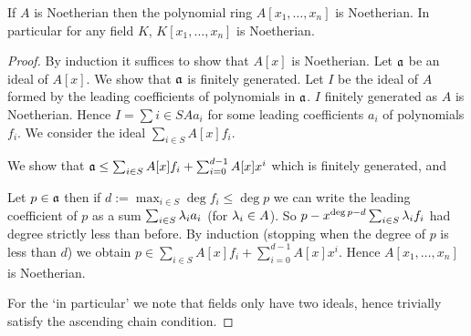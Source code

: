 \begin{prop}
    If $A$ is Noetherian then the polynomial ring $A[x_1, \dots, x_n]$ 
    is Noetherian.
    In particular for any field $K$, $K[x_1, \dots, x_n]$ 
    is Noetherian.
\end{prop}
\begin{proof}
    By induction it suffices to show that $A[x]$ is Noetherian.
    Let $\mathfrak{a}$ be an ideal of $A[x]$. 
    We show that $\mathfrak{a}$ is finitely generated.
    Let $I$ be the ideal of $A$ 
    formed by the leading coefficients of polynomials in $\mathfrak{a}$.
    $I$ finitely generated as $A$ is Noetherian.
    Hence $I = \sum{i\in S} A a_i$ for some leading coefficients $a_i$ of 
    polynomials $f_i$.
    We consider the ideal $\sum_{i \in S}A[x]f_i$.

    We show that $\mathfrak{a} \leq \sum_{i \in S}A[x]f_i + \sum_{i=0}^{d-1}A[x]x^i$ 
    which is finitely generated, and 

    Let $p \in \mathfrak{a}$ then if $d := \max_{i \in S} \deg f_i \leq \deg p$
    we can write the leading coefficient of $p$ as a sum 
    $\sum_{i \in S} \lambda_i a_i$ (for $\lambda_i \in A$).
    So $p - x^{\deg p - d} \sum_{i \in S} \lambda_i f_i$ had degree strictly
    less than before.
    By induction (stopping when the degree of $p$ is less than $d$) we obtain 
    $p \in \sum_{i \in S}A[x]f_i + \sum_{i=0}^{d-1}A[x]x^i$.
    Hence $A[x_1, \dots, x_n]$ is Noetherian.

    For the `in particular' we note that fields only have two ideals,
    hence trivially satisfy the ascending chain condition.
\end{proof}